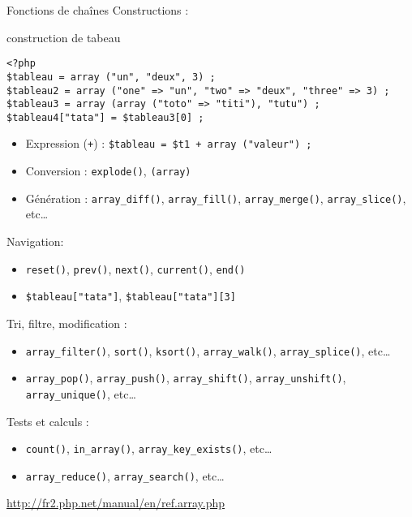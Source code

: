 \begin{frame}[containsverbatim]{Fonctions de chaînes}
	Constructions :
	\begin{block}{construction de tabeau}
		\begin{lstlisting}
<?php
$tableau = array ("un", "deux", 3) ;
$tableau2 = array ("one" => "un", "two" => "deux", "three" => 3) ;
$tableau3 = array (array ("toto" => "titi"), "tutu") ;
$tableau4["tata"] = $tableau3[0] ;
		\end{lstlisting}
	\end{block}
	\begin{itemize}
		\item Expression (\texttt{+}) : \lstinline~$tableau = $t1 + array ("valeur") ;~
		\item Conversion : \lstinline~explode()~, \lstinline~(array)~
		\item Génération : \lstinline~array_diff()~, \lstinline~array_fill()~, \lstinline~array_merge()~, \lstinline~array_slice()~, etc\ldots
	\end{itemize}
	Navigation:
	\begin{itemize}
		\item \lstinline~reset()~, \lstinline~prev()~, \lstinline~next()~, \lstinline~current()~, \lstinline~end()~ 
		\item \lstinline~$tableau["tata"]~, \lstinline~$tableau["tata"][3]~
	\end{itemize}
	Tri, filtre, modification :
	\begin{itemize}
		\item \lstinline~array_filter()~, \lstinline~sort()~, \lstinline~ksort()~, \lstinline~array_walk()~, \lstinline~array_splice()~, etc\ldots
		\item \lstinline~array_pop()~, \lstinline~array_push()~, \lstinline~array_shift()~, \lstinline~array_unshift()~, \lstinline~array_unique()~, etc\ldots
	\end{itemize}
		Tests et calculs :
	\begin{itemize}
		\item \lstinline~count()~, \lstinline~in_array()~, \lstinline~array_key_exists()~, etc\ldots
		\item \lstinline~array_reduce()~, \lstinline~array_search()~, etc\ldots
	\end{itemize}
	\url{http://fr2.php.net/manual/en/ref.array.php}\\
\end{frame}
 
